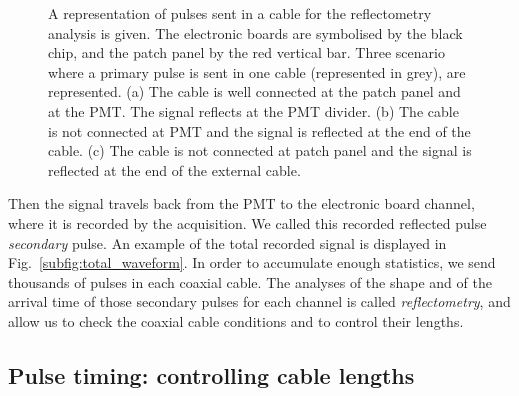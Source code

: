 \begin{figure}[h]
\begin{subfigure}[b]{0.3\textwidth}
  \end{subfigure}
  \caption{A representation of pulses sent in a cable for the reflectometry analysis is given.
    The electronic boards are symbolised by the black chip, and the patch panel by the red vertical bar.
    Three scenario where a primary pulse is sent in one cable (represented in grey), are represented.
    (a) The cable is well connected at the patch panel and at the PMT. The signal reflects at the PMT divider.
    (b) The cable is not connected at PMT and the signal is reflected at the end of the cable.
    (c) The cable is not connected at patch panel and the signal is reflected at the end of the external cable.\label{fig:reflecto_scheme}}

\end{figure}
Then the signal travels back from the PMT to the electronic board channel, where it is recorded by the acquisition.
We called this recorded reflected pulse \emph{secondary} pulse.
An example of the total recorded signal is displayed in Fig.~\ref{subfig:total_waveform}.
In order to accumulate enough statistics, we send thousands of pulses in each coaxial cable.
The analyses of the shape and of the arrival time of those secondary pulses for each channel is called \emph{reflectometry}, and allow us to check the coaxial cable conditions and to control their lengths.

\subsection{Pulse timing: controlling cable lengths}
\label{subsec:timing}

